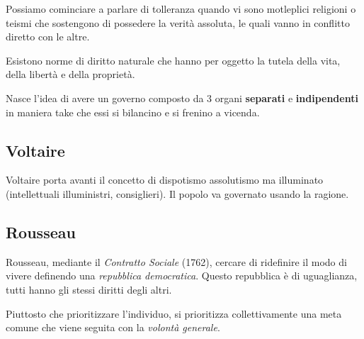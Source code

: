 \documentclass[a4paper]{article}
\begin{document}
Possiamo cominciare a parlare di tolleranza quando vi sono motleplici religioni o teismi che sostengono di possedere la verità assoluta, le quali vanno in conflitto diretto con le altre.


Esistono norme di diritto naturale che hanno per oggetto la tutela della vita, della libertà e della proprietà.

Nasce l'idea di avere un governo composto da 3 organi \textbf{separati}
e \textbf{indipendenti} in maniera take che essi si bilancino e si frenino a vicenda.

\subsection{Voltaire}


Voltaire porta avanti il concetto di dispotismo assolutismo ma illuminato (intellettuali illuministri, consiglieri).
Il popolo va governato usando la ragione.

\subsection{Rousseau}

Rousseau, mediante il \textit{Contratto Sociale} (1762),
cercare di ridefinire il modo di vivere definendo una \textit{repubblica democratica}.
Questo repubblica è di uguaglianza, tutti hanno gli stessi diritti degli altri.

Piuttosto che prioritizzare l'individuo, si prioritizza collettivamente una meta comune
che viene seguita con la \textit{volontà generale}.
\end{document}
